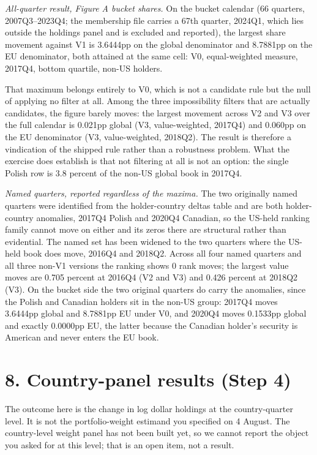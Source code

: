 \documentclass[11pt]{article}
\begin{document}
\emph{All-quarter result, Figure A bucket shares.} On the bucket calendar (66
quarters, 2007Q3--2023Q4; the membership file carries a 67th quarter, 2024Q1,
which lies outside the holdings panel and is excluded and reported), the
largest share movement against V1 is 3.6444pp on the global denominator and
8.7881pp on the EU denominator, both attained at the same cell: V0,
equal-weighted measure, 2017Q4, bottom quartile, non-US holders.

That maximum belongs entirely to V0, which is not a candidate rule but the
null of applying no filter at all. Among the three impossibility filters that
are actually candidates, the figure barely moves: the largest movement across
V2 and V3 over the full calendar is 0.021pp global (V3, value-weighted,
2017Q4) and 0.060pp on the EU denominator (V3, value-weighted, 2018Q2). The
result is therefore a vindication of the shipped rule rather than a robustness
problem. What the exercise does establish is that not filtering at all is not
an option: the single Polish row is 3.8 percent of the non-US global book in
2017Q4.

\emph{Named quarters, reported regardless of the maxima.} The two originally
named quarters were identified from the holder-country deltas table and are
both holder-country anomalies, 2017Q4 Polish and 2020Q4 Canadian, so the
US-held ranking family cannot move on either and its zeros there are
structural rather than evidential. The named set has been widened to the two
quarters where the US-held book does move, 2016Q4 and 2018Q2. Across all four
named quarters and all three non-V1 versions the ranking shows 0 rank moves;
the largest value moves are 0.705 percent at 2016Q4 (V2 and V3) and 0.426
percent at 2018Q2 (V3). On the bucket side the two original quarters do carry
the anomalies, since the Polish and Canadian holders sit in the non-US group:
2017Q4 moves 3.6444pp global and 8.7881pp EU under V0, and 2020Q4 moves
0.1533pp global and exactly 0.0000pp EU, the latter because the Canadian
holder's security is American and never enters the EU book.

\section*{8. Country-panel results (Step 4)}

The outcome here is the change in log dollar holdings at the country-quarter
level. It is not the portfolio-weight estimand you specified on 4 August. The
country-level weight panel has not been built yet, so we cannot report the
object you asked for at this level; that is an open item, not a result.
\end{document}
